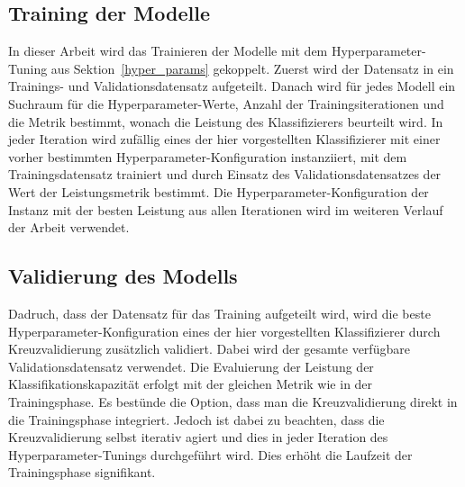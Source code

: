\subsection*{Training der Modelle}
In dieser Arbeit wird das Trainieren der Modelle mit dem Hyperparameter-Tuning aus Sektion~\ref{hyper_params} gekoppelt. Zuerst wird der Datensatz in ein Trainings- und Validationsdatensatz aufgeteilt. Danach wird für jedes Modell ein Suchraum für die Hyperparameter-Werte, Anzahl der Trainingsiterationen und die Metrik bestimmt, wonach die Leistung des Klassifizierers
beurteilt wird. In jeder Iteration wird zufällig eines der hier vorgestellten Klassifizierer mit einer vorher bestimmten Hyperparameter-Konfiguration instanziiert, mit dem Trainingsdatensatz trainiert und durch Einsatz des Validationsdatensatzes der Wert der Leistungsmetrik bestimmt. Die Hyperparameter-Konfiguration der Instanz mit der besten Leistung aus allen Iterationen wird im weiteren Verlauf der Arbeit verwendet.

\subsection*{Validierung des Modells}
Dadruch, dass der Datensatz für das Training aufgeteilt wird, wird die beste Hyperparameter-Konfiguration eines der hier vorgestellten Klassifizierer durch Kreuzvalidierung zusätzlich validiert. 
Dabei wird der gesamte verfügbare Validationsdatensatz verwendet. Die Evaluierung der Leistung der Klassifikationskapazität erfolgt mit der gleichen Metrik wie in der Trainingsphase. Es bestünde die Option, dass man die Kreuzvalidierung direkt in die Trainingsphase integriert. 
Jedoch ist dabei zu beachten, dass die Kreuzvalidierung selbst iterativ agiert und dies in jeder Iteration des Hyperparameter-Tunings durchgeführt wird. Dies erhöht die Laufzeit der Trainingsphase signifikant.